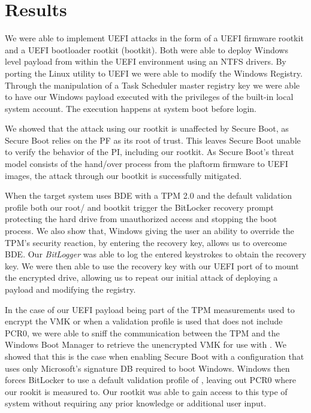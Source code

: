 
\chapter{Results}

We were able to implement \ac{UEFI} attacks in the form of a \ac{UEFI} firmware rootkit and a \ac{UEFI} bootloader rootkit (bootkit).
Both were able to deploy Windows level payload from within the \ac{UEFI} environment using an \ac{NTFS} drivers.
By porting the Linux utility  to \ac{UEFI} we were able to modify the Windows Registry.
Through the manipulation of a Task Scheduler master registry key we were able to have our Windows payload executed with the privileges of the built-in local system account.
The execution happens at system boot before login.

We showed that the attack using our rootkit is unaffected by Secure Boot, as Secure Boot relies on the \ac{PF} as its root of trust.
This leaves Secure Boot unable to verify the behavior of the \ac{PI}, including our rootkit.
As Secure Boot's threat model consists of the hand\-/over process from the plaftorm firmware to \ac{UEFI} images, the attack through our bootkit is successfully mitigated.

When the target system uses \ac{BDE} with a \ac{TPM} 2.0 and the default validation profile  both our root\-/ and bootkit trigger the BitLocker recovery prompt protecting the hard drive from unauthorized access and stopping the boot process.
We also show that, Windows giving the user an ability to override the \ac{TPM}'s security reaction, by entering the recovery key, allows us to overcome \ac{BDE}.
Our \emph{BitLogger} was able to log the entered keystrokes to obtain the recovery key.
We were then able to use the recovery key with our \ac{UEFI} port of  to mount the encrypted drive, allowing us to repeat our initial attack of deploying a payload and modifying the registry.

In the case of our \ac{UEFI} payload being part of the \ac{TPM} measurements used to encrypt the \ac{VMK} or when a validation profile is used that does not include \ac{PCR}0, we were able to sniff the communication between the \ac{TPM} and the Windows Boot Manager to retrieve the unencrypted \ac{VMK} for use with .
We showed that this is the case when enabling Secure Boot with a configuration that uses only Microsoft's signature \ac{DB} required to boot Windows.
Windows then forces BitLocker to use a default validation profile of , leaving out \ac{PCR}0 where our rookit is measured to.
Our rootkit was able to gain access to this type of system without requiring any prior knowledge or additional user input.